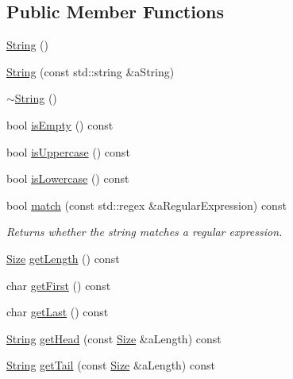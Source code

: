 \subsection*{Public Member Functions}
\begin{DoxyCompactItemize}
\item 
\hyperlink{classostk_1_1core_1_1types_1_1_string_a0f8e66f16108a449b1256c252c48ed3b}{String} ()
\item 
\hyperlink{classostk_1_1core_1_1types_1_1_string_aaaee3324b9d426284056794371932be5}{String} (const std\+::string \&a\+String)
\item 
\hyperlink{classostk_1_1core_1_1types_1_1_string_a9e8dd0b032ca07128968c7045158f0c4}{$\sim$\+String} ()
\item 
bool \hyperlink{classostk_1_1core_1_1types_1_1_string_abb04266529e07a89458cdd13516ff7cc}{is\+Empty} () const
\item 
bool \hyperlink{classostk_1_1core_1_1types_1_1_string_aae72dd9dba796952b935143d62b2b0a2}{is\+Uppercase} () const
\item 
bool \hyperlink{classostk_1_1core_1_1types_1_1_string_aab60cc8d552ebf3f32390af4a69af4ca}{is\+Lowercase} () const
\item 
bool \hyperlink{classostk_1_1core_1_1types_1_1_string_ac6fd01a3b12e86f08e61019799d8dc4d}{match} (const std\+::regex \&a\+Regular\+Expression) const
\begin{DoxyCompactList}\small\item\em Returns whether the string matches a regular expression. \end{DoxyCompactList}\item 
\hyperlink{namespaceostk_1_1core_1_1types_acf68f214a245e35a7c1994c84dc56746}{Size} \hyperlink{classostk_1_1core_1_1types_1_1_string_ab7529208a6f0acff749eb9a542b251d4}{get\+Length} () const
\item 
char \hyperlink{classostk_1_1core_1_1types_1_1_string_a54b1f561ed3634235d92f164e183db6f}{get\+First} () const
\item 
char \hyperlink{classostk_1_1core_1_1types_1_1_string_a9e2d1e808250b0987fae382912eb93d5}{get\+Last} () const
\item 
\hyperlink{classostk_1_1core_1_1types_1_1_string}{String} \hyperlink{classostk_1_1core_1_1types_1_1_string_a743124ed7378a1c6485621722216aed8}{get\+Head} (const \hyperlink{namespaceostk_1_1core_1_1types_acf68f214a245e35a7c1994c84dc56746}{Size} \&a\+Length) const
\item 
\hyperlink{classostk_1_1core_1_1types_1_1_string}{String} \hyperlink{classostk_1_1core_1_1types_1_1_string_aac6bc1ec037565caf85886b2e4177446}{get\+Tail} (const \hyperlink{namespaceostk_1_1core_1_1types_acf68f214a245e35a7c1994c84dc56746}{Size} \&a\+Length) const

\end{DoxyCompactItemize}
